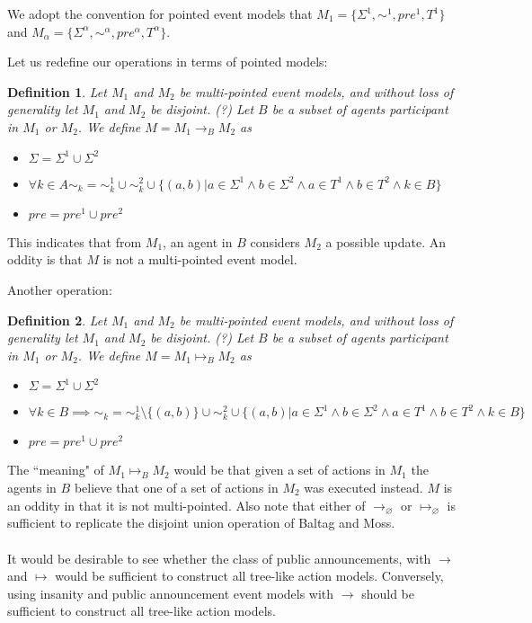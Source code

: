 \documentclass[12pt, a4paper, titlepage]{scrartcl}
\newtheorem{defn}{Definition}
\begin{document}
We adopt the convention for pointed event models that $M_1 = \{\Sigma^1, \sim^1,
pre^1, T^1\}$ and $M_\alpha = \{\Sigma^\alpha,\sim^\alpha,pre^\alpha,T^\alpha\}$.

Let us redefine our operations in terms of pointed models:
\begin{defn} \label{possOne}
Let $M_1$ and $M_2$ be multi-pointed event models, and without loss of
generality let $M_1$ and $M_2$ be disjoint. (?)
Let $B$ be a subset of agents participant in $M_1$ or $M_2$.
We define $M = M_1 \to_B M_2$ as 
\begin{itemize}
  \item $\Sigma = \Sigma^1 \cup \Sigma^2$
  \item $\forall k \in A \sim_k = \sim^1_k \cup \sim^2_k \cup \{(a, b) | a \in \Sigma^1 \land b \in
  \Sigma^2 \land a \in T^1 \land b \in T^2 \land k \in B\}$
  \item $pre = pre^1 \cup pre^2$
\end{itemize}
\end{defn}

This indicates that from $M_1$, an agent in $B$ considers $M_2$ a possible
update.
An oddity is that $M$ is not a multi-pointed event model.

Another operation:
\begin{defn} \label{possTwo}
Let $M_1$ and $M_2$ be multi-pointed event models, and without loss of
generality let $M_1$ and $M_2$ be disjoint. (?)
Let $B$ be a subset of agents participant in $M_1$ or $M_2$.
We define $M = M_1 \mapsto_B M_2$ as 
\begin{itemize}
  \item $\Sigma = \Sigma^1 \cup \Sigma^2$
  \item $\forall k \in B \implies \sim_k = \sim^1_k \setminus \{ (a,b) \} \cup \sim^2_k \cup \{(a, b) | a \in \Sigma^1 \land b \in
  \Sigma^2 \land a \in T^1 \land b \in T^2 \land k \in B \}$
  \item $pre = pre^1 \cup pre^2$
\end{itemize}
\end{defn}

The ``meaning" of $M_1 \mapsto_B M_2$ would be that given a set of actions in
$M_1$ the agents in $B$ believe that one of a set of actions in $M_2$ was
executed instead.
$M$ is an oddity in that it is not multi-pointed.
Also note that either of $\to_\varnothing$ or $\mapsto_\varnothing$ is
sufficient to replicate the disjoint union operation of Baltag and Moss.\\
\\
It would be desirable to see whether the class of public announcements, with
$\to$ and $\mapsto$ would be sufficient to construct all tree-like action
models.
Conversely, using insanity and public announcement event models with $\to$ should be sufficient to construct
all tree-like action models.
\end{document}
